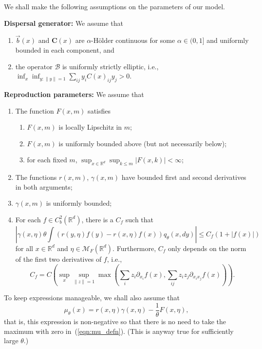 \documentclass[EJP]{ejpecp} %
\newcommand{\IR}{\mathbb R}
\newcommand{\DG}{\mathcal{B}}  %
\newcommand{\meanq}{\vec b}    %
\newcommand{\covq}{\mathbf{C}}     %
\newcommand{\measures}{\mathcal{M}_F(\IR^d)} %
\begin{document}
\begin{assumptions}%
\label{def:model_setup}
We shall make the following assumptions on the parameters of our model.

{\bf Dispersal generator:}
We assume that
\begin{enumerate}
    \item $\meanq(x)$ and $\covq(x)$ are
        $\alpha$-H\"older continuous for some $\alpha \in (0, 1]$
        and uniformly bounded
        in each component, and
    \item the operator $\DG$ is uniformly strictly elliptic,
        i.e., $\inf_x \inf_{y:\|y\|=1} \sum_{ij} y_i C(x)_{ij} y_j > 0$.
\end{enumerate}

{\bf Reproduction parameters:}
We assume that 
\begin{enumerate}
            \addtocounter{enumi}{2}
\item The function $F(x,m)$ satisfies 
    \begin{enumerate}
    \item $F(x,m)$ is locally Lipschitz in $m$;
    \item $F(x,m)$ is uniformly bounded above (but not necessarily below);
    \item for each fixed $m$, $\sup_{x\in\IR^d}\sup_{k\leq m}|F(x,k)|<\infty$;
    \end{enumerate}
\item The functions $r(x,m)$, $\gamma(x,m)$ have bounded first and second 
    derivatives in both arguments;
    \label{r_gamma_derivs_condition}
\item $\gamma(x,m)$ is uniformly bounded;
    \label{gamma_bounded_condition}
\item For each $f \in C_b^2(\IR^d)$,
    there is a $C_f$ such that
    $$
        |\gamma(x, \eta) \theta \int 
        (r(y,\eta) f(y) - r(x, \eta) f(x))
        q_\theta(x, dy)| \le C_f (1 + |f(x)|)
    $$
    for all $x \in \IR^d$ and $\eta \in \measures$.
    Furthermore, $C_f$ only depends on the norm of the first two derivatives of $f$,
    i.e., 
    \[
        C_f = C(\sup_x \sup_{\|z\|=1} \max( \sum_i z_i \partial_{x_i} f(x), \sum_{ij} z_i z_j \partial_{x_i x_j} f(x))) .
    \] \label{gamma_B_condition} 
\end{enumerate}
To keep expressions manageable, we shall also assume that  
\[
\mu_\theta(x) = r(x,\eta) \gamma(x,\eta) - \frac{1}{\theta} F(x,\eta),
\]
that is, this expression is non-negative so that there is no need to take the maximum
	with zero in~(\ref{eqn:mu_defn}). (This is anyway true for 
	sufficiently large $\theta$.)
\end{assumptions}
\end{document}
